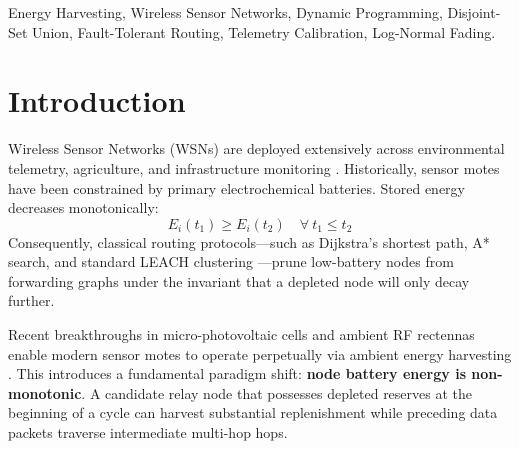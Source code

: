 \documentclass[conference]{IEEEtran}
\begin{document}
\begin{abstract}
We validate the framework through an automated 75-test unit verification suite (100\% pass rate) and multi-seed statistical benchmarks ($N=30$ seeds, 350 rounds). Empirical results confirm that under scarce energy regimes, our belief-driven routing closes up to $81.5\%$ of the omniscient oracle delivery gap while reducing Expected Calibration Error (ECE = 0.019 vs 0.039) over stale telemetry. In a real-world case study on the Great Duck Island habitat topology ($N=32$ motes, 60\% spruce canopy shade), our framework sustains 100\% mote survival with zero node deaths across 500 rounds (+15.5\% lifetime extension over LEACH).
\end{abstract}

\begin{IEEEkeywords}
Energy Harvesting, Wireless Sensor Networks, Dynamic Programming, Disjoint-Set Union, Fault-Tolerant Routing, Telemetry Calibration, Log-Normal Fading.
\end{IEEEkeywords}

\section{Introduction}

Wireless Sensor Networks (WSNs) are deployed extensively across environmental telemetry, agriculture, and infrastructure monitoring \cite{akyildiz2002survey, sah2020renewable}. Historically, sensor motes have been constrained by primary electrochemical batteries. Stored energy decreases monotonically:
\begin{equation}
E_i(t_1) \ge E_i(t_2) \quad \forall\ t_1 \le t_2
\end{equation}
Consequently, classical routing protocols---such as Dijkstra's shortest path, A* search, and standard LEACH clustering \cite{heinzelman2002application}---prune low-battery nodes from forwarding graphs under the invariant that a depleted node will only decay further.

Recent breakthroughs in micro-photovoltaic cells and ambient RF rectennas enable modern sensor motes to operate perpetually via ambient energy harvesting \cite{sudevalayam2011energy, sharma2020energy}. This introduces a fundamental paradigm shift: \textbf{node battery energy is non-monotonic}. A candidate relay node that possesses depleted reserves at the beginning of a cycle can harvest substantial replenishment while preceding data packets traverse intermediate multi-hop hops.
\end{document}
